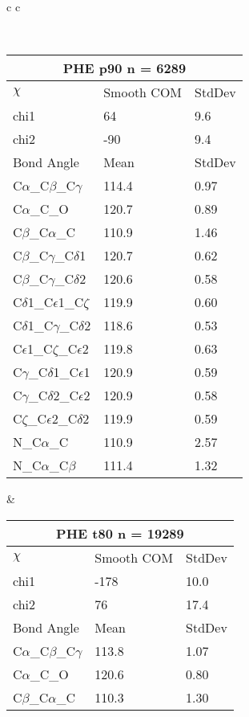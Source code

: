 \newpage

\begin{longtable}{ c c }

\caption{PHE Central Values}\\
  \begin{tabular}{ l l l }
  \toprule
  \multicolumn{3}{c}{PHE \textbf{p90} n = 6289} \\ \toprule
  $\chi$       & Smooth COM & StdDev \\ \midrule
  chi1 & 64 & 9.6 \\ 
  chi2 & -90 & 9.4 \\ \midrule
  Bond Angle   & Mean     & StdDev \\ \midrule
  C$\alpha$\_C$\beta$\_C$\gamma$ & 114.4 & 0.97\\
  C$\alpha$\_C\_O & 120.7 & 0.89\\
  C$\beta$\_C$\alpha$\_C & 110.9 & 1.46\\
  C$\beta$\_C$\gamma$\_C$\delta$1 & 120.7 & 0.62\\
  C$\beta$\_C$\gamma$\_C$\delta$2 & 120.6 & 0.58\\
  C$\delta$1\_C$\epsilon$1\_C$\zeta$ & 119.9 & 0.60\\
  C$\delta$1\_C$\gamma$\_C$\delta$2 & 118.6 & 0.53\\
  C$\epsilon$1\_C$\zeta$\_C$\epsilon$2 & 119.8 & 0.63\\
  C$\gamma$\_C$\delta$1\_C$\epsilon$1 & 120.9 & 0.59\\
  C$\gamma$\_C$\delta$2\_C$\epsilon$2 & 120.9 & 0.58\\
  C$\zeta$\_C$\epsilon$2\_C$\delta$2 & 119.9 & 0.59\\
  N\_C$\alpha$\_C & 110.9 & 2.57\\
  N\_C$\alpha$\_C$\beta$ & 111.4 & 1.32\\
  \bottomrule
  \end{tabular}
  &
  \begin{tabular}{ l l l }
  \toprule
  \multicolumn{3}{c}{PHE \textbf{t80} n = 19289} \\ \toprule
  $\chi$       & Smooth COM & StdDev \\ \midrule
  chi1 & -178 & 10.0 \\ 
  chi2 & 76 & 17.4 \\ \midrule
  Bond Angle   & Mean     & StdDev \\ \midrule
  C$\alpha$\_C$\beta$\_C$\gamma$ & 113.8 & 1.07\\
  C$\alpha$\_C\_O & 120.6 & 0.80\\
  C$\beta$\_C$\alpha$\_C & 110.3 & 1.30\\

\end{tabular}
\end{longtable}
